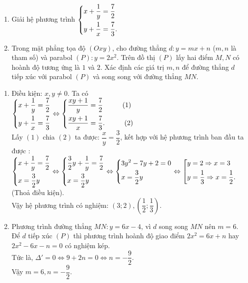 \begin{ex}%
\hfill
\begin{enumerate}
	\item Giải hệ phương trình $\left\{\begin{aligned}&x+\dfrac{1}{y}=\dfrac{7}{2}\\&y+\dfrac{1}{x}=\dfrac{7}{3}.\end{aligned}\right.$
	\item Trong mặt phẳng tọa độ $(Oxy)$, cho đường thẳng $d$$:y=mx+n$ ($m,n$ là tham số) và parabol $(P)$$:y=2x^2$. Trên đồ thị $(P)$ lấy hai điểm $M,N$ có hoành độ tương ứng là $1$ và $2$. Xác định các giá trị $m,n$ để đường thẳng $d$ tiếp xúc với parabol $(P)$ và song song với đường thẳng $MN$. 
\end{enumerate}
\loigiai
    {
    \begin{enumerate}
        \item Điều kiện: $x,y \neq 0$. Ta có \\
        $\left\{\begin{aligned}&x+\dfrac{1}{y}=\dfrac{7}{2}\\&y+\dfrac{1}{x}=\dfrac{7}{3}\end{aligned}\right. \Leftrightarrow \left\{\begin{aligned}&\dfrac{xy+1}{y}=\dfrac{7}{2}\hspace*{1cm}(1) \\&\dfrac{xy+1}{x}=\dfrac{7}{3}.\hspace*{1cm}(2)\end{aligned}\right.$\\
        Lấy $(1)$ chia $(2)$ ta được: $\dfrac{x}{y}=\dfrac{3}{2}$, kết hợp với hệ phương trình ban đầu ta được :\\
        $\left\{\begin{aligned}&x+\dfrac{1}{y}=\dfrac{7}{2}\\&x=\dfrac{3}{2}y\end{aligned}\right. \Leftrightarrow \left\{\begin{aligned}&\dfrac{3}{2}y+\dfrac{1}{y}=\dfrac{7}{2} \\&x=\dfrac{3}{2}y\end{aligned}\right.
        \Leftrightarrow \left\{\begin{aligned}&3y^2-7y+2=0\\&x=\dfrac{3}{2}y\end{aligned}\right. \Leftrightarrow \left[\begin{aligned}&y=2 \Rightarrow x=3\\&y=\dfrac{1}{3}\Rightarrow x=\dfrac{1}{2}.\end{aligned}\right.$(Thoả điều kiện).\\
        Vậy hệ phương trình có nghiệm: $(3;2), \left(\dfrac{1}{2};\dfrac{1}{3}\right).$
        \item Phương trình đường thẳng $MN:y=6x-4$, vì $d$ song song $MN$ nên $m=6$.\\
        Để $d$ tiếp xúc $(P)$ thì phương trình hoành độ giao điểm $2x^2=6x+n$ hay $2x^2-6x-n=0$ có nghiệm kép.\\
        Tức là, $\Delta'=0 \Leftrightarrow 9+2n=0 \Leftrightarrow n=-\dfrac{9}{2}.$\\
        Vậy $m=6, n=-\dfrac{9}{2}.$
    \end{enumerate}
    }
\end{ex}

